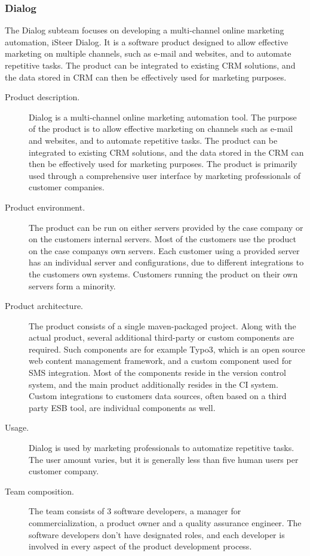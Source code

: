 \documentclass[english]{tktltiki2}
\theoremstyle{definition}
\theoremstyle{remark}
\begin{document}
\subsubsection{Dialog}
The Dialog subteam focuses on developing a multi-channel online marketing automation, iSteer Dialog. It is a software product designed to allow effective marketing on multiple channels, such as e-mail and websites, and to automate repetitive tasks. The product can be integrated to existing CRM solutions, and the data stored in CRM can then be effectively used for marketing purposes. 

\begin{description}
  \item[Product description.] Dialog is a multi-channel online marketing automation tool. The purpose of the product is to allow effective marketing on channels such as e-mail and websites, and to automate repetitive tasks. The product can be integrated to existing CRM solutions, and the data stored in the CRM can then be effectively used for marketing purposes. The product is primarily used through a comprehensive user interface by marketing professionals of customer companies. 
  \item[Product environment.] The product can be run on either servers provided by the case company or on the customers internal servers. Most of the customers use the product on the case companys own servers. Each customer using a provided server has an individual server and configurations, due to different integrations to the customers own systems. Customers running the product on their own servers form a minority.
  \item[Product architecture.] The product consists of a single maven-packaged project. Along with the actual product, several additional third-party or custom components are required. Such components are for example Typo3, which is an open source web content management framework, and a custom component used for SMS integration. Most of the components reside in the version control system, and the main product additionally resides in the CI system. Custom integrations to customers data sources, often based on a third party ESB tool, are individual components as well.
  \item[Usage.] Dialog is used by marketing professionals to automatize repetitive tasks. The user amount varies, but it is generally less than five human users per customer company.
  \item[Team composition.] The team consists of 3 software developers, a manager for commercialization, a product owner and a quality assurance engineer. The software developers don't have designated roles, and each developer is involved in every aspect of the product development process.

\end{description}
\end{document}
